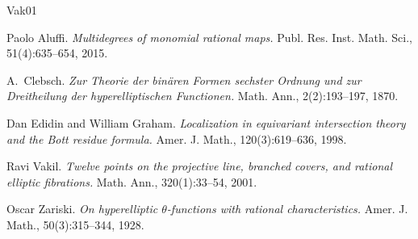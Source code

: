 \documentclass[12pt]{article}
\theoremstyle{plain}
\theoremstyle{remark}
\begin{document}
\begin{thebibliography}{Vak01}

Paolo Aluffi.
\textit{Multidegrees of monomial rational maps.}
Publ. Res. Inst. Math. Sci., 51(4):635--654, 2015.

A.~Clebsch.
\textit{Zur Theorie der bin\"aren Formen sechster Ordnung und zur Dreitheilung der hyperelliptischen Functionen.}
Math. Ann., 2(2):193--197, 1870.

Dan Edidin and William Graham.
\textit{Localization in equivariant intersection theory and the Bott residue formula.}
Amer. J. Math., 120(3):619--636, 1998.

Ravi Vakil.
\textit{Twelve points on the projective line, branched covers, and rational elliptic fibrations.}
Math. Ann., 320(1):33--54, 2001.

Oscar Zariski.
\textit{On hyperelliptic $\theta$-functions with rational characteristics.}
Amer. J. Math., 50(3):315--344, 1928.

\end{thebibliography}
\end{document}
